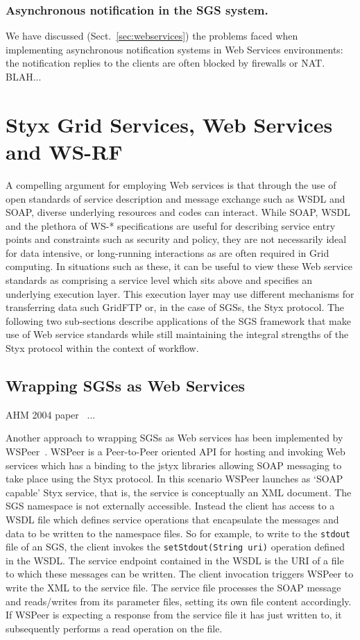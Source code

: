 \documentclass{llncs}
\begin{document}
\subsubsection{Asynchronous notification in the SGS system.}
We have discussed (Sect.~\ref{sec:webservices}) the problems faced when implementing asynchronous notification systems in Web Services environments: the notification replies to the clients are often blocked by firewalls or NAT.  BLAH...


\section{Styx Grid Services, Web Services and WS-RF}\label{sec:wsrf}

A compelling argument for employing Web services is that through the use of open standards of service description and message exchange such as WSDL and SOAP, diverse underlying resources and codes can interact. While SOAP, WSDL and the plethora of WS-* specifications are useful for describing service entry points and constraints such as security and policy, they are not necessarily ideal for data intensive, or long-running interactions as are often required in Grid computing. In situations such as these, it can be useful to view these Web service standards as comprising a service level which sits above and specifies an underlying execution layer. This execution layer may use different mechanisms for transferring data such GridFTP or, in the case of SGSs, the Styx protocol. The following two sub-sections describe applications of the SGS framework that make use of Web service standards while still maintaining the integral strengths of the Styx protocol within the context of workflow.

\subsection{Wrapping SGSs as Web Services}
AHM 2004 paper~\cite{blower:2004} ...

Another approach to wrapping SGSs as Web services has been implemented by WSPeer~\cite{wspeer}. WSPeer is a Peer-to-Peer oriented API for hosting and invoking Web services which has a binding to the jstyx libraries allowing SOAP messaging to take place using the Styx protocol. In this scenario WSPeer launches as `SOAP capable' Styx service, that is, the service is conceptually an XML document. The SGS namespace is not externally accessible. Instead the client has access to a WSDL file which defines service operations that encapsulate the messages and data to be written to the namespace files. So for example, to write to the \texttt{stdout} file of an SGS, the client invokes the \texttt{setStdout(String uri)} operation defined in the WSDL. The service endpoint contained in the WSDL is the URI of a file to which these messages can be written. The client invocation triggers WSPeer to write the XML to the service file. The service file processes the SOAP message and reads/writes from its parameter files, setting its own file content accordingly. If WSPeer is expecting a response from the service file it has just written to, it subsequently performs a read operation on the file.
\end{document}
